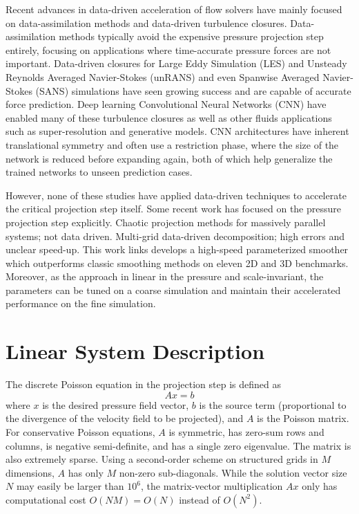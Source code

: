 \documentclass[review]{elsarticle}
\begin{document}
Recent advances in data-driven acceleration of flow solvers have mainly focused on data-assimilation methods and data-driven turbulence closures. Data-assimilation methods typically avoid the expensive pressure projection step entirely, focusing on applications where time-accurate pressure forces are not important. Data-driven closures for Large Eddy Simulation (LES) and Unsteady Reynolds Averaged Navier-Stokes (unRANS) and even Spanwise Averaged Navier-Stokes (SANS) simulations have seen growing success and are capable of accurate force prediction. Deep learning Convolutional Neural Networks (CNN) have enabled many of these turbulence closures as well as other fluids applications such as super-resolution and generative models. CNN architectures have inherent translational symmetry and often use a restriction phase, where the size of the network is reduced before expanding again, both of which help generalize the trained networks to unseen prediction cases. 

However, none of these studies have applied data-driven techniques to accelerate the critical projection step itself. Some recent work has focused on the pressure projection step explicitly. Chaotic projection methods for massively parallel systems; not data driven. Multi-grid data-driven decomposition; high errors and unclear speed-up. This work links develops a high-speed parameterized smoother which outperforms classic smoothing methods on eleven 2D and 3D benchmarks. Moreover, as the approach in linear in the pressure and scale-invariant, the parameters can be tuned on a coarse simulation and maintain their accelerated performance on the fine simulation. 

\section{Linear System Description}

The discrete Poisson equation in the projection step is defined as
\begin{equation}\label{eq:axb}
    A x = b
\end{equation}
where $x$ is the desired pressure field vector, $b$ is the source term (proportional to the divergence of the velocity field to be projected), and $A$ is the Poisson matrix. For conservative Poisson equations, $A$ is symmetric, has zero-sum rows and columns, is negative semi-definite, and has a single zero eigenvalue. The matrix is also extremely sparse. Using a second-order scheme on structured grids in $M$ dimensions, $A$ has only $M$ non-zero sub-diagonals. While the solution vector size $N$ may easily be larger than $10^6$, the matrix-vector multiplication $Ax$ only has computational cost $O(NM)=O(N)$ instead of $O(N^2)$.
\end{document}
